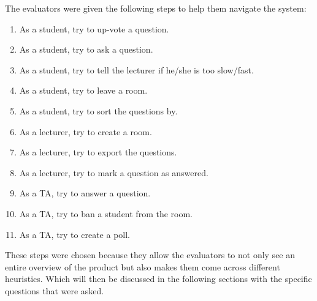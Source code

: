 \documentclass{article}
\begin{document}
    The evaluators were given the following steps to help them navigate the system:
    \begin{enumerate}
        \item As a student, try to up-vote a question.
        \item As a student, try to ask a question.
        \item As a student, try to tell the lecturer if he/she is too slow/fast.
        \item As a student, try to leave a room.
        \item As a student, try to sort the questions by.
        \item As a lecturer, try to create a room.
        \item As a lecturer, try to export the questions.
        \item As a lecturer, try to mark a question as answered.
        \item As a TA, try to answer a question.
        \item As a TA, try to ban a student from the room.
        \item As a TA, try to create a poll.
    \end{enumerate}
    These steps were chosen because they allow the evaluators to not only see an entire overview of the product but also makes them come across different heuristics. Which will then be discussed in the following sections with the specific questions that were asked.
\end{document}

